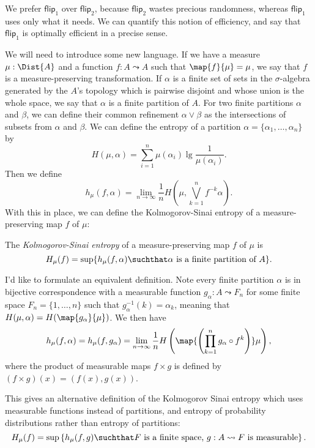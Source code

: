 We prefer $\mathsf{flip}_1$ over $\mathsf{flip}_2$, because $\mathsf{flip}_2$ wastes precious randomness, whereas $\mathsf{flip}_1$ uses only what it needs. We can quantify this notion of efficiency, and say that $\mathsf{flip}_1$ is optimally efficient in a precise sense.

We will need to introduce some new language. If we have a measure $\mu : \Dist{A}$ and a function $f : A \leadsto A$ such that $\map{f}{\mu} = \mu$, we say that $f$ is a measure-preserving transformation. If $\alpha$ is a finite set of sets in the $\sigma$-algebra generated by the $A$'s topology which is pairwise disjoint and whose union is the whole space, we say that $\alpha$ is a finite partition of $A$. For two finite partitions $\alpha$ and $\beta$, we can define their common refinement $\alpha \vee \beta$ as the intersections of subsets from $\alpha$ and $\beta$. We can define the entropy of a partition $\alpha = \{\alpha_1, \ldots, \alpha_n\}$ by
\[
H(\mu, \alpha) = \sum_{i = 1}^n \mu(\alpha_i) \lg \frac{1}{\mu(\alpha_i)}.
\]
Then we define
\[
h_\mu(f, \alpha) = \lim_{n \to \infty} \frac{1}{n} H\left(\mu, \bigvee_{k = 1}^n f^{-k}\alpha  \right).
\]
With this in place, we can define the Kolmogorov-Sinai entropy of a measure-preserving map $f$ of $\mu$:

\begin{definition}
The \emph{Kolmogorov-Sinai entropy} of a measure-preserving map $f$ of $\mu$ is
\[
H_\mu(f) = \sup \{ h_\mu(f, \alpha) \suchthat \text{$\alpha$ is a finite partition of $A$} \}.
\]
\end{definition}

I'd like to formulate an equivalent definition. Note every finite partition $\alpha$ is in bijective correspondence with a measurable function $g_\alpha : A \leadsto F_n$ for some finite space $F_n = \{1, \ldots, n \}$ such that $g_\alpha^{-1}(k) = \alpha_k$, meaning that $H(\mu, \alpha) = H(\map{g_\alpha}{\mu})$. We then have
\[
h_\mu(f, \alpha) = h_\mu(f, g_\alpha) = \lim_{n \to \infty} \frac{1}{n} H\left( \map{\left(\prod_{k = 1}^n g_\alpha \circ f^k\right)} \mu \right),
\]
where the product of measurable maps $f \times g$ is defined by $(f \times g)(x) = (f(x), g(x))$.

This gives an alternative definition of the Kolmogorov Sinai entropy which uses measurable functions instead of partitions, and entropy of probability distributions rather than entropy of partitions:
\[
H_\mu(f) = \sup \left\{ h_\mu(f, g) \suchthat \text{$F$ is a finite space, $g : A \leadsto F$ is measurable} \right\}.
\]

